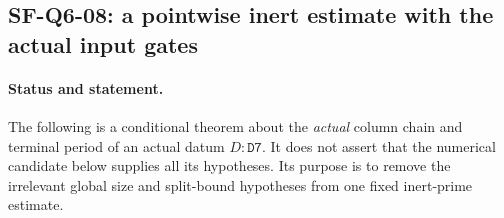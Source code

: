 \subsection{SF-Q6-08: a pointwise inert estimate with the actual input gates}

\paragraph{Status and statement.}
The following is a conditional theorem about the \emph{actual} column
chain and terminal period of an actual datum $D:\texttt{D7}$.
It does not assert that the numerical candidate below supplies all its
hypotheses.  Its purpose is to remove the irrelevant global size and
split-bound hypotheses from one fixed inert-prime estimate.


